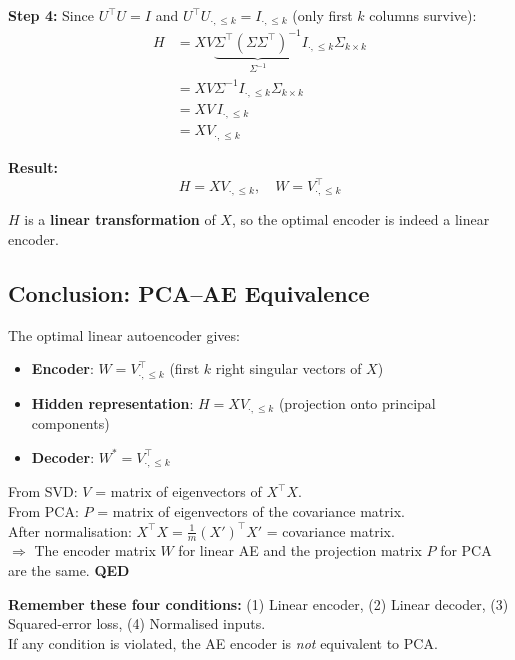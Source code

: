 \documentclass[12pt,a4paper]{article}
\begin{document}
\textbf{Step 4:} Since $U^\top U = I$ and $U^\top U_{\cdot,\leq k} = I_{\cdot,\leq k}$ (only first $k$ columns survive):
\begin{align*}
H &= XV\underbrace{\Sigma^\top(\Sigma\Sigma^\top)^{-1}}_{\Sigma^{-1}} I_{\cdot,\leq k}\Sigma_{k\times k}\\
  &= XV\Sigma^{-1}I_{\cdot,\leq k}\Sigma_{k\times k}\\
  &= XV\,I_{\cdot,\leq k}\\
  &= XV_{\cdot,\leq k}
\end{align*}

\textbf{Result:}
\[
\boxed{H = XV_{\cdot,\leq k},\quad W = V_{\cdot,\leq k}^\top}
\]

$H$ is a \textbf{linear transformation} of $X$, so the optimal encoder is indeed a linear encoder.

\subsection{Conclusion: PCA--AE Equivalence}

\begin{thmbox}[title={PCA--AE Equivalence (Proof)}]
The optimal linear autoencoder gives:
\begin{itemize}
  \item \textbf{Encoder}: $W = V_{\cdot,\leq k}^\top$ (first $k$ right singular vectors of $X$)
  \item \textbf{Hidden representation}: $H = XV_{\cdot,\leq k}$ (projection onto principal components)
  \item \textbf{Decoder}: $W^* = V_{\cdot,\leq k}^\top$
\end{itemize}
From SVD: $V$ = matrix of eigenvectors of $X^\top X$.\\
From PCA: $P$ = matrix of eigenvectors of the covariance matrix.\\
After normalisation: $X^\top X = \frac{1}{m}(X')^\top X'$ = covariance matrix.\\
$\Rightarrow$ The encoder matrix $W$ for linear AE and the projection matrix $P$ for PCA are the same. \textbf{QED}
\end{thmbox}

\begin{notebox}
\textbf{Remember these four conditions:}
(1) Linear encoder, (2) Linear decoder, (3) Squared-error loss, (4) Normalised inputs.\\
If any condition is violated, the AE encoder is \emph{not} equivalent to PCA.
\end{notebox}
\end{document}

